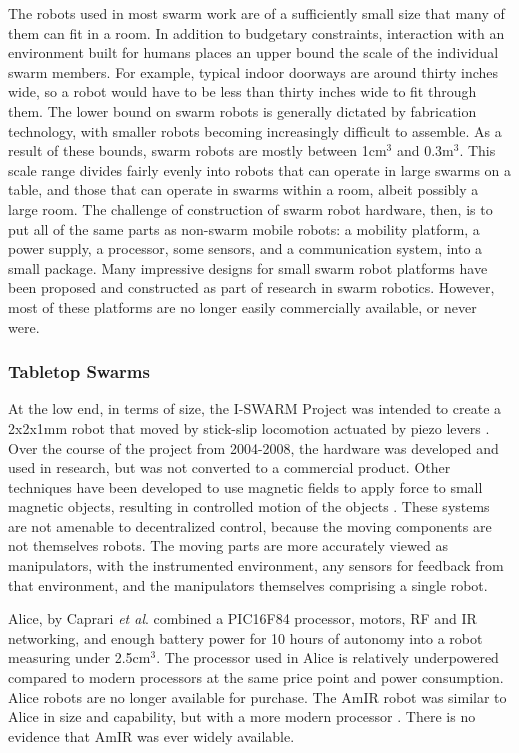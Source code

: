 The robots used in most swarm work are of a sufficiently small size that many of them can fit in a room. In addition to budgetary constraints, interaction with an environment built for humans places an upper bound the scale of the individual swarm members. 
For example, typical indoor doorways are around thirty inches wide, so a robot would have to be less than thirty inches wide to fit through them. 
The lower bound on swarm robots is generally dictated by fabrication technology, with smaller robots becoming increasingly difficult to assemble. 
As a result of these bounds, swarm robots are mostly between 1cm$^3$ and 0.3m$^3$. 
This scale range divides fairly evenly into robots that can operate in large swarms on a table, and those that can operate in swarms within a room, albeit possibly a large room. 
The challenge of construction of swarm robot hardware, then, is to put all of the same parts as non-swarm mobile robots: a mobility platform, a power supply, a processor, some sensors, and a communication system, into a small package.
Many impressive designs for small swarm robot platforms have been proposed and constructed as part of research in swarm robotics. 
However, most of these platforms are no longer easily commercially available, or never were. 

\subsubsection{Tabletop Swarms}

At the low end, in terms of size, the I-SWARM Project was intended to create a 2x2x1mm robot that moved by stick-slip locomotion actuated by piezo levers \cite{seyfried2005swarm}. 
Over the course of the project from 2004-2008, the hardware was developed and used in research, but was not converted to a commercial product.
Other techniques have been developed to use magnetic fields to apply force to small magnetic objects, resulting in controlled motion of the objects \cite{floyd2008untethered, pelrine2012diamagnetically}.
These systems are not amenable to decentralized control, because the moving components are not themselves robots. 
The moving parts are more accurately viewed as manipulators, with the instrumented environment, any sensors for feedback from that environment, and the manipulators themselves comprising a single robot. 

Alice, by Caprari \emph{et al}. \cite{caprari1998autonomous} combined a PIC16F84 processor, motors, RF and IR networking, and enough battery power for 10 hours of autonomy into a robot measuring under 2.5cm$^3$. 
The processor used in Alice is relatively underpowered compared to modern processors at the same price point and power consumption. 
Alice robots are no longer available for purchase. 
The AmIR robot was similar to Alice in size and capability, but with a more modern processor \cite{arvin2009development}.
There is no evidence that AmIR was ever widely available.

